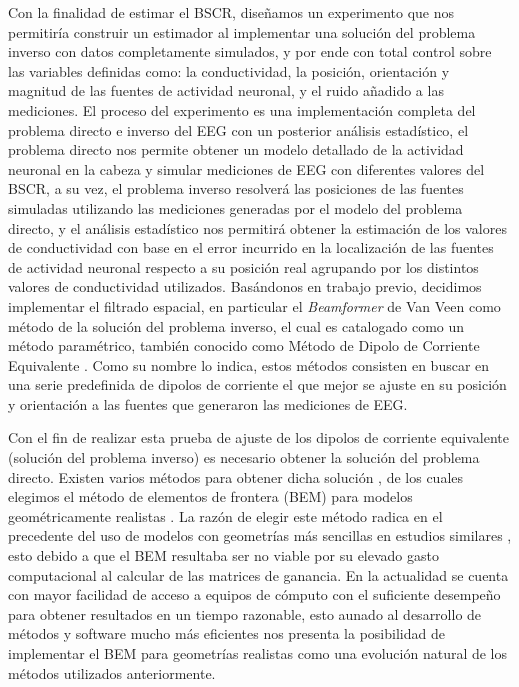 Con la finalidad de estimar el BSCR, diseñamos un experimento que nos permitiría construir un estimador al implementar una solución del problema inverso con datos completamente simulados, y por ende con total control sobre las variables definidas como: la conductividad, la posición, orientación y magnitud de las fuentes de actividad neuronal, y el ruido añadido a las mediciones. El proceso del experimento es una implementación completa del problema directo e inverso del EEG con un posterior análisis estadístico, el problema directo nos permite obtener un modelo detallado de la actividad neuronal en la cabeza y simular mediciones de EEG con diferentes valores del BSCR, a su vez, el problema inverso resolverá las posiciones de las fuentes simuladas utilizando las mediciones generadas por el modelo del problema directo, y el análisis estadístico nos permitirá obtener la estimación de los valores de conductividad con base en el error incurrido en la localización de las fuentes de actividad neuronal respecto a su posición real agrupando por los distintos valores de conductividad utilizados. Basándonos en trabajo previo, decidimos implementar el filtrado espacial, en particular el \emph{Beamformer} de Van Veen \cite{VanVeen1988} como método de la solución del problema inverso, el cual es catalogado como un método paramétrico, también conocido como Método de Dipolo de Corriente Equivalente \cite{Grech2008}. Como su nombre lo indica, estos métodos consisten en buscar en una serie predefinida de dipolos de corriente el que mejor se ajuste en su posición y orientación a las fuentes que generaron las mediciones de EEG. 

Con el fin de realizar esta prueba de ajuste de los dipolos de corriente equivalente (solución del problema inverso) es necesario obtener la solución del problema directo. Existen varios métodos para obtener dicha solución \cite{Mosher1999}, de los cuales elegimos el método de elementos de frontera (BEM) para modelos geométricamente realistas \cite{Ermer2001}. La razón de elegir este método radica en el precedente del uso de modelos con geometrías más sencillas en estudios similares \cite{Gutierrez2004}, esto debido a que el BEM resultaba ser no viable por su elevado gasto computacional al calcular de las matrices de ganancia. En la actualidad se cuenta con mayor facilidad de acceso a equipos de cómputo con el suficiente desempeño para obtener resultados en un tiempo razonable, esto aunado al desarrollo de métodos y software mucho más eficientes \cite{open,Clerc2010} nos presenta la posibilidad de implementar el BEM para geometrías realistas como una evolución natural de los métodos utilizados anteriormente.

